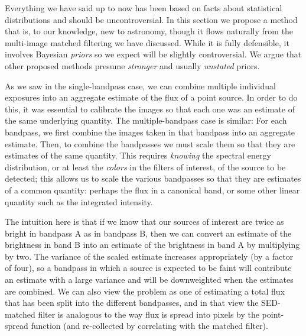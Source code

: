 \documentclass[11pt,letterpaper,linenumbers]{aastex63}
\begin{document}
Everything we have said up to now has been based on facts about
statistical distributions and should be uncontroversial.  In this
section we propose a method that is, to our knowledge, new to
astronomy, though it flows naturally from the multi-image matched
filtering we have discussed. While it is fully defensible, it involves
Bayesian \emph{priors} so we expect will be slightly controversial.  We argue
that other proposed methods presume \emph{stronger} and usually
\emph{unstated} priors.

As we saw in the single-bandpass case, we can combine multiple
individual exposures into an aggregate estimate of the flux of a point
source.  In order to do this, it was essential to calibrate the images
so that each one was an estimate of the same underlying quantity.  The
multiple-bandpass case is similar: For each bandpass, we first combine
the images taken in that bandpass into an aggregate estimate.  Then,
to combine the bandpasses we must scale them so that they are
estimates of the same quantity.  This requires \emph{knowing} the
spectral energy distribution, or at least the \emph{colors} in the
filters of interest, of the source to be detected; this allows us to
scale the various bandpasses so that they are estimates of a common
quantity: perhaps the flux in a canonical band, or some other linear
quantity such as the integrated intensity.



The intuition here is that if we know that our sources of interest are
twice as bright in bandpass A as in bandpass B, then we can convert an
estimate of the brightness in band B into an estimate of the
brightness in band A by multiplying by two.  The variance of the
scaled estimate increases appropriately (by a factor of four), so a
bandpass in which a source is expected to be faint will contribute an
estimate with a large variance and will be downweighted when the
estimates are combined.  We can also view the problem as one of
estimating a total flux that has been split into the different
bandpasses, and in that view the SED-matched filter is analogous to
the way flux is spread into pixels by the point-spread function (and
re-collected by correlating with the matched filter).

\newcommand{\sigdj}{\sigma_{D_j}}
\end{document}
